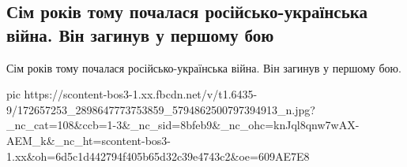  
 
 
 
 

\subsection{Сім років тому почалася російсько-українська війна.  Він загинув у першому бою}

Сім років тому почалася російсько-українська війна.  Він загинув у першому бою.

\ifcmt
  pic https://scontent-bos3-1.xx.fbcdn.net/v/t1.6435-9/172657253_2898647773753859_5794862500797394913_n.jpg?_nc_cat=108&ccb=1-3&_nc_sid=8bfeb9&_nc_ohc=knJql8qnw7wAX-AEM_k&_nc_ht=scontent-bos3-1.xx&oh=6d5c1d442794f405b65d32c39e4743c2&oe=609AE7E8
\fi

